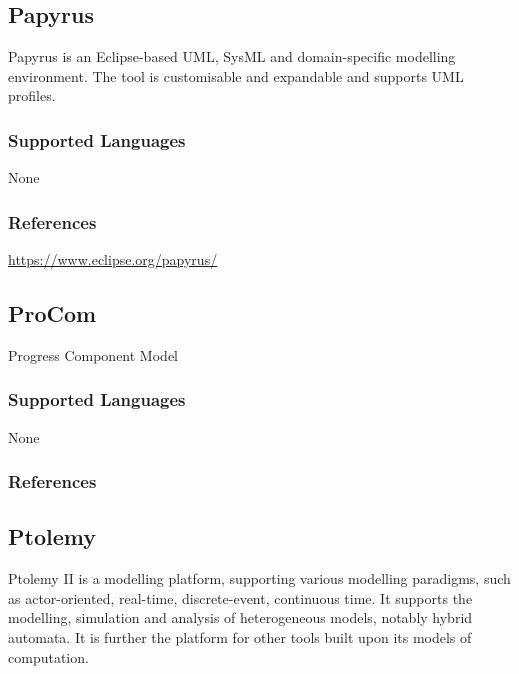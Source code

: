 \subsection{Papyrus}
\label{subsecT:Papyrus}


Papyrus is an Eclipse-based UML, SysML and domain-specific modelling environment.
The tool is customisable and expandable and supports UML profiles.

\subsubsection{Supported Languages}

None


\subsubsection{References}

\url{https://www.eclipse.org/papyrus/}




\subsection{ProCom}
\label{subsecT:ProCom}

Progress Component Model

\subsubsection{Supported Languages}

None


\subsubsection{References}





\subsection{Ptolemy}
\label{subsecT:Ptolemy}


Ptolemy II is a modelling platform, supporting various modelling paradigms, such as actor-oriented, real-time, discrete-event, continuous time.
It supports the modelling, simulation and analysis of heterogeneous models, notably hybrid automata.
It is further the platform for other tools built upon its models of computation.

